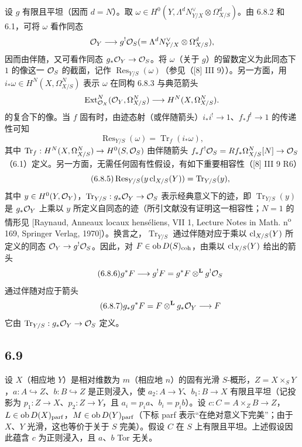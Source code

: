 设 $g$ 有限且平坦（因而 $d=N$）。取 $\omega\in H^0(Y,\Lambda^d N_{Y/X}^{\vee}\otimes\Omega^d_{X/S})$。由 6.8.2 和 6.1，可将 $\omega$ 看作同态
\[
\mathcal{O}_Y\longrightarrow g^!\mathcal{O}_S(=\Lambda^d N_{Y/X}^{\vee}\otimes\Omega^d_{X/S}),
\]
因而由伴随，又可看作同态 $g_*\mathcal{O}_Y\to\mathcal{O}_S$。将 $\omega$（关于 $g$）的留数定义为此同态下 $1$ 的像这一 $\mathcal{O}_S$ 的截面，记作 $\operatorname{Res}_{Y/S}(\omega)$（参见（[8] III 9））。另一方面，用 $i_*\omega\in H^N(X,\Omega^N_{X/S})$ 表示 $\omega$ 在同构 6.8.3 与典范箭头
\[
\operatorname{Ext}^N_{\mathcal{O}_X}(\mathcal{O}_Y,\Omega^N_{X/S})\longrightarrow H^N(X,\Omega^N_{X/S}).
\]
的复合下的像。当 $f$ 固有时，由迹态射（或伴随箭头）$i_*i^!\to 1$、$f_*f^!\to 1$ 的传递性可知
\begin{equation}
\tag{6.8.4}
\operatorname{Res}_{Y/S}(\omega)=\operatorname{Tr}_f(i_*\omega),
\end{equation}
其中 $\operatorname{Tr}_f:H^N(X,\Omega^N_{X/S})\to H^0(S,\mathcal{O}_S)$ 由伴随箭头 $f_*f^!\mathcal{O}_S=Rf_*\Omega^N_{X/S}[N]\to\mathcal{O}_S$（6.1）定义。另一方面，无需任何固有性假设，有如下重要相容性（[8] III 9 R6）
\begin{equation}
\tag{6.8.5}
\operatorname{Res}_{Y/S}(y\operatorname{cl}_{X/S}(Y))=\operatorname{Tr}_{Y/S}(y),
\end{equation}
其中 $y\in H^0(Y,\mathcal{O}_Y)$，$\operatorname{Tr}_{Y/S}:g_*\mathcal{O}_Y\to\mathcal{O}_S$ 表示经典意义下的迹，即 $\operatorname{Tr}_{Y/S}(y)$ 是 $g_*\mathcal{O}_Y$ 上乘以 $y$ 所定义自同态的迹（所引文献没有证明这一相容性；$N=1$ 的情形见 [Raynaud, Anneaux locaux henséliens, VII 1, Lecture Notes in Math. n\textsuperscript{o} 169, Springer Verlag, 1970]）。换言之，$\operatorname{Tr}_{Y/S}$ 通过伴随对应于乘以 $\operatorname{cl}_{X/S}(Y)$ 所定义的同态 $\mathcal{O}_Y\to g^!\mathcal{O}_S$。因此，对 $F\in\operatorname{ob} D(S)_{\mathrm{coh}}$，由乘以 $\operatorname{cl}_{X/S}(Y)$ 给出的箭头
\begin{equation}
\tag{6.8.6}
g^*F\longrightarrow g^!F=g^*F\otimes^{\mathbf L}g^!\mathcal{O}_S
\end{equation}
通过伴随对应于箭头
\begin{equation}
\tag{6.8.7}
g_*g^*F=F\otimes^{\mathbf L}g_*\mathcal{O}_Y\longrightarrow F
\end{equation}
它由 $\operatorname{Tr}_{Y/S}:g_*\mathcal{O}_Y\to\mathcal{O}_S$ 定义。


\subsection*{6.9}

设 $X$（相应地 $Y$）是相对维数为 $m$（相应地 $n$）的固有光滑 $S$-概形，$Z=X\times_S Y$，$a:A\hookrightarrow Z$、$b:B\hookrightarrow Z$ 是正则浸入，使 $a_2:A\to Y$、$b_1:B\to X$ 有限且平坦（记投影为 $p_1:Z\to X$、$p_2:Z\to Y$，且 $a_i=p_i a$、$b_i=p_i b$）。设 $c:C=A\times_Z B\to Z$，$L\in\operatorname{ob} D(X)_{\mathrm{parf}}$，$M\in\operatorname{ob} D(Y)_{\mathrm{parf}}$（下标 parf 表示“在绝对意义下完美”；由于 $X$、$Y$ 光滑，这也等价于关于 $S$ 完美）。假设 $C$ 在 $S$ 上有限且平坦。上述假设因此蕴含 $c$ 为正则浸入，且 $a$、$b$ Tor 无关。

